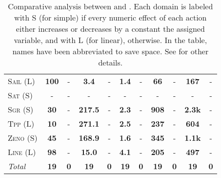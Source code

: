 \documentclass[11pt,landscape]{article}
\begin{document}
\begin{table*}[tb]
{\begin{tabular}{|l||cc||cc||cc||cc||cc||}
\textsc{Sail} (L)&\textbf{100}&-&\textbf{3.4}&-&\textbf{1.4}&-&\textbf{66}&-&\textbf{167}&-\\
\textsc{Sat} (S)&-&-&-&-&-&-&-&-&-&-\\
\textsc{Sgr} (S)&\textbf{30}&-&\textbf{217.5}&-&\textbf{2.3}&-&\textbf{908}&-&\textbf{2.3k}&-\\
\textsc{Tpp} (L)&\textbf{10}&-&\textbf{271.1}&-&\textbf{2.5}&-&\textbf{237}&-&\textbf{604}&-\\
\textsc{Zeno} (S)&\textbf{45}&-&\textbf{168.9}&-&\textbf{1.6}&-&\textbf{345}&-&\textbf{1.1k}&-\\
\textsc{Line} (L)&\textbf{98}&-&\textbf{15.0}&-&\textbf{4.1}&-&\textbf{205}&-&\textbf{497}&-
\\\hline
\textit{Total}&\textbf{19}&\textbf{0}&\textbf{19}&\textbf{0}&\textbf{19}&\textbf{0}&\textbf{19}&\textbf{0}&\textbf{19}&\textbf{0}\\\hline

        \end{tabular}}
        \caption{Comparative analysis between  \pattya and \pattye. Each domain is labeled with S (for simple) if every numeric effect of each action either increases or decreases by a constant the assigned variable, and with L (for linear), otherwise. In the table, names have been abbreviated to save space.  See \cite{ipc2023} for other details.}
        \label{tab:exp-patty-a-patty-e}
        \end{table*}
        
\end{document}
